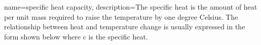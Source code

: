 {
    name=specific heat capacity,
    description={The specific heat is the amount of heat per unit mass required to raise the temperature by one degree Celsius. The relationship between heat and temperature change is usually expressed in the form shown below where c is the specific heat.}
}
